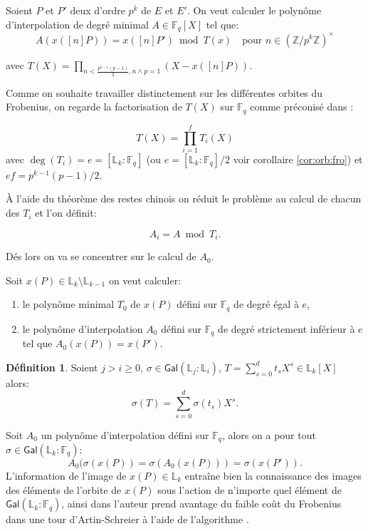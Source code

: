 \documentclass[10pt,a4paper]{book}
\theoremstyle{plain}
\theoremstyle{definition}
\theoremstyle{definition}
\theoremstyle{definition}
\theoremstyle{definition}
\theoremstyle{definition}
\newtheorem{defi}[thm]{Définition}
\theoremstyle{remark}
\theoremstyle{remark}
\theoremstyle{definition}
\begin{document}
Soient $P$ et $P'$ deux d'ordre $p^k$ de $E$ et $E'$. On veut calculer le 
polynôme d'interpolation de degré minimal $A \in \mathbb{F}_q[X]$ tel que:
\begin{equation}
A(x([n]P))=x([n]P') \bmod T(x) \quad \text{pour } n \in \left( \mathbb{Z}/p^k\mathbb{Z} \right)^{\times}
\end{equation} 

avec $T(X)= \prod_{n < \frac{p^{k-1}(p-1)}{2}, n \wedge p =1} (X-x([n]P))$.

Comme on souhaite travailler distinctement sur les différentes orbites du Frobenius, on regarde la factorisation de $T(X)$ sur $\mathbb{F}_q$ comme préconisé dans \cite{Couveignes96}:

\begin{equation*}
T(X)=\prod_{i=1}^fT_{i}(X)
\end{equation*}
avec $\deg(T_i)=e=[\mathbb{L}_k:\mathbb{F}_q]$ (ou $e=[\mathbb{L}_k:\mathbb{F}_q]/2$ voir corollaire \ref{cor:orb:fro}) et $ef=p^{k-1}(p-1)/2$.

\`A l'aide du théorème des restes chinois on réduit le problème au calcul de chacun des $T_{i}$ et l'on définit:

\begin{equation}
A_{i}=A \bmod{T_{i}}.
\end{equation}

Dés lors on va se concentrer sur le calcul de $A_{0}$.


Soit $x(P) \in \mathbb{L}_k \setminus \mathbb{L}_{k-1}$ on veut 
calculer: 
\begin{enumerate}
\item le polynôme minimal $T_{0}$ de $x(P)$ défini sur $\mathbb{F}_q$ de degré égal à $e$,
\item le polynôme d'interpolation $A_0$ défini sur $\mathbb{F}_q$ de degré strictement inférieur à $e$ tel que $A_0(x(P))=x(P')$.
\end{enumerate}

\begin{defi}
Soient $j > i \geqslant 0$, $\sigma \in \mathsf{Gal}(\mathbb{L}_j:\mathbb{L}_i)$, $T=\sum_{s=0}^{d}t_sX^s \in \mathbb{L}_k[X]$ alors:
\[
\sigma(T)=\sum_{s=0}^{d}\sigma(t_s)X^s.
\]   
\end{defi}

Soit $A_0$ un polynôme d'interpolation défini sur $\mathbb{F}_q$, alors on a pour tout $\sigma \in \mathsf{Gal}(\mathbb{L}_k:\mathbb{F}_q)$:
\begin{equation*}
A_0(\sigma(x(P))=\sigma(A_0(x(P)))=\sigma(x(P')).
\end{equation*}
L'information de l'image de $x(P) \in \mathbb{L}_k$ entraîne bien la connaissance des images des éléments de l'orbite de $x(P)$ sous l'action de n'importe quel élément de $\mathsf{Gal}(\mathbb{L}_k:\mathbb{F}_q)$, ainsi dans \cite{DeFeo11} l'auteur prend avantage du faible coût du Frobenius dans une tour d'Artin-Schreier à l'aide de l'algorithme \cite[Iter Frobenius,Theorem 17 et 18]{DeFeo-Shost'12}. %
\end{document}
